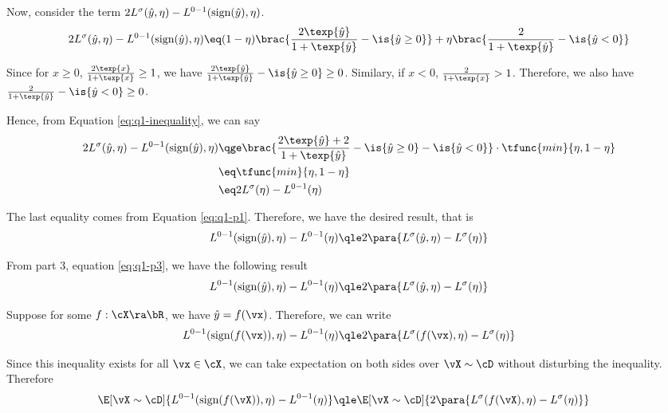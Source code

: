 \documentclass[a4paper,10pt]{article}
\begin{document}
\begin{question}
\begin{qpart}{3}
		Now, consider the term $2L^{\sigma}(\hat{y}, \eta) - L^{0-1}(\text{sign}(\hat{y}), \eta)$.
		\begin{align*}
			2L^{\sigma}(\wy, \eta) - L^{0-1}(\sgn(\wy), \eta)	\eq	(1 - \eta) \brac{\frac{2 \texp{\wy}}{1 + \texp{\wy}} - \is{\wy \ge 0}} + \eta \brac{\frac{2}{1 + \texp{\wy}} - \is{\wy < 0}} \\
		\end{align*}

		Since for $x \ge 0$, $\frac{2 \texp{x}}{1 + \texp{x}} \ge 1$, we have $\frac{2 \texp{\wy}}{1 + \texp{\wy}} - \is{\wy \ge 0} \ge 0$. Similary, if $x < 0$, $\frac{2}{1 + \texp{x}} > 1$. Therefore, we also have $\frac{2}{1 + \texp{\wy}} - \is{\wy < 0} \ge 0$.

		Hence, from Equation \ref{eq:q1-inequality}, we can say
		\begin{align*}
			2L^{\sigma}(\wy, \eta) - L^{0-1}(\sgn(\wy), \eta)	&\qge	\brac{\frac{2 \texp{\wy} + 2}{1 + \texp{\wy}} - \is{\wy \ge 0} - \is{\wy < 0}} \cdot \tfunc{min}{\eta, 1 - \eta} \\
			&\eq	\tfunc{min}{\eta, 1 - \eta} \\
			&\eq	2 L^{\sigma}(\eta) - L^{0-1}(\eta)
		\end{align*}

		The last equality comes from Equation \ref{eq:q1-p1}. Therefore, we have the desired result, that is
		\begin{equation}
			L^{0-1}(\sgn(\wy), \eta) - L^{0-1}(\eta)	\qle	2 \para{L^{\sigma}(\wy, \eta) - L^{\sigma}(\eta)}
			\label{eq:q1-p3}
		\end{equation}

	\end{qpart}

	\begin{qpart}{4}

		From part 3, equation \ref{eq:q1-p3}, we have the following result
		\begin{align*}
			L^{0-1}(\sgn(\wy), \eta) - L^{0-1}(\eta)	\qle	2 \para{L^{\sigma}(\wy, \eta) - L^{\sigma}(\eta)}
		\end{align*}

		Suppose for some $f : \cX \ra \bR$, we have $\wy = f(\vx)$. Therefore, we can write
		\begin{align*}
			L^{0-1}(\sgn(f(\vx)), \eta) - L^{0-1}(\eta)	\qle	2 \para{L^{\sigma}(f(\vx), \eta) - L^{\sigma}(\eta)}
		\end{align*}

		Since this inequality exists for all $\vx \in \cX$, we can take expectation on both sides over $\vX \sim \cD$ without disturbing the inequality. Therefore
		\begin{align*}
			\E[\vX \sim \cD]{L^{0-1}(\sgn(f(\vX)), \eta) - L^{0-1}(\eta)}	&\qle	\E[\vX \sim \cD]{2 \para{L^{\sigma}(f(\vX), \eta) - L^{\sigma}(\eta)}}
		\end{align*}


\end{qpart}
\end{question}
\end{document}
